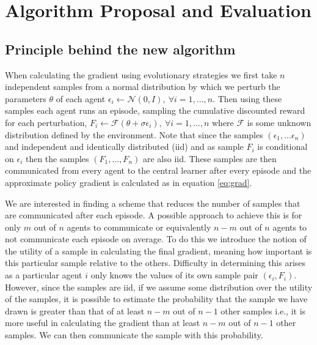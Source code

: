 \chapter{Algorithm Proposal and Evaluation}
\section{Principle behind the new algorithm}
When calculating the gradient using evolutionary strategies we first take $n$ independent samples from a normal distribution by which we perturb the parameters $\theta$ of each agent $\epsilon_i \leftarrow \mathcal{N}(0,I), \ \forall i=1,\dots,n$. Then using these samples each agent runs an episode, sampling the cumulative discounted reward for each perturbation, $F_i \leftarrow \mathcal{F}(\theta+\sigma \epsilon_i), \ \forall i=1,\dots,n$ where $\mathcal{F}$ is some unknown distribution defined by the environment. Note that since the samples $(\epsilon_1,\dots\epsilon_n)$ and independent and identically distributed (iid) and as sample $F_i$ is conditional on $\epsilon_i$ then the samples $(F_1,\dots,F_n)$ are also iid. These samples are then communicated from every agent to the central learner after every episode and the approximate policy gradient is calculated as in equation \ref{eq:grad}.

We are interested in finding a scheme that reduces the number of samples that are communicated after each episode. A possible approach to achieve this is for only $m$ out of $n$ agents to communicate or equivalently $n-m$ out of $n$ agents to not communicate each episode on average. To do this we introduce the notion of the utility of a sample in calculating the final gradient, meaning how important is this particular sample relative to the others. Difficulty in determining this arises as a particular agent $i$ only knows the values of its own sample pair $(\epsilon_i, F_i)$. However, since the samples are iid, if we assume some distribution over the utility of the samples, it is possible to estimate the probability that the sample we have drawn is greater than that of at least $n-m$ out of $n-1$ other samples i.e., it is more useful in calculating the gradient than at least $n-m$ out of $n-1$ other samples. We can then communicate the sample with this probability.

